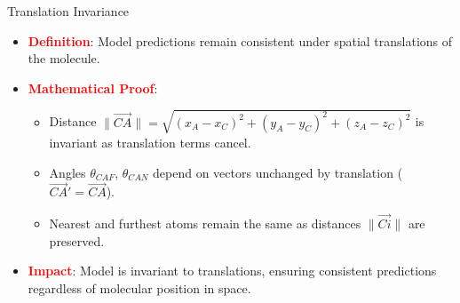 \documentclass[10pt]{beamer}
\begin{document}
\begin{frame}{Translation Invariance}
  \begin{itemize}
    \item \textcolor{red}{\textbf{Definition}}: Model predictions remain consistent under spatial translations of the molecule.
    \vspace{0.3cm}
    \item \textcolor{red}{\textbf{Mathematical Proof}}:
    \vspace{0.3cm}
      \begin{itemize}
        \item Distance \( \|\vec{CA}\| = \sqrt{(x_A - x_C)^2 + (y_A - y_C)^2 + (z_A - z_C)^2} \) is invariant as translation terms cancel.
        \vspace{0.3cm}
        \item Angles \( \theta_{CAF} \), \( \theta_{CAN} \) depend on vectors unchanged by translation (\( \vec{CA}' = \vec{CA} \)).
        \vspace{0.3cm}
        \item Nearest and furthest atoms remain the same as distances \( \|\vec{Ci}\| \) are preserved.
      \end{itemize}
    \vspace{0.3cm}
    \item \textcolor{red}{\textbf{Impact}}: Model is invariant to translations, ensuring consistent predictions regardless of molecular position in space.
  \end{itemize}
\end{frame}
\end{document}
